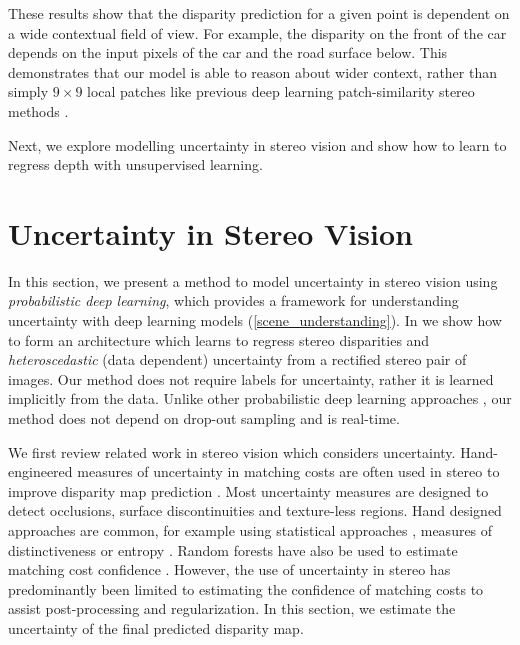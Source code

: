These results show that the disparity prediction for a given point is dependent on a wide contextual field of view. For example, the disparity on the front of the car depends on the input pixels of the car and the road surface below. This demonstrates that our model is able to reason about wider context, rather than simply $9\times9$ local patches like previous deep learning patch-similarity stereo methods \citep{zbontar2016stereo,luo2016efficient}.

Next, we explore modelling uncertainty in stereo vision and show how to learn to regress depth with unsupervised learning.




\section{Uncertainty in Stereo Vision}

In this section, we present a method to model uncertainty in stereo vision using \textit{probabilistic deep learning}, which provides a framework for understanding uncertainty with deep learning models (\cref{scene_understanding}). In  we show how to form an architecture which learns to regress stereo disparities and \textit{heteroscedastic} (data dependent) uncertainty \citep{der2009aleatory} from a rectified stereo pair of images. Our method does not require labels for uncertainty, rather it is learned implicitly from the data. Unlike other probabilistic deep learning approaches \citep{gal2016thesis}, our method does not depend on drop-out sampling and is real-time.

We first review related work in stereo vision which considers uncertainty. Hand-engineered measures of uncertainty in matching costs are often used in stereo to improve disparity map prediction \citep{hu2012quantitative,egnal2004stereo}. Most uncertainty measures are designed to detect occlusions, surface discontinuities and texture-less regions. Hand designed approaches are common, for example using statistical approaches \citep{sabater2012meaningful}, measures of distinctiveness \citep{yoon2007stereo,manduchi1999distinctiveness} or entropy \citep{scharstein1998stereo}. Random forests have also be used to estimate matching cost confidence  \citep{Haeusler2013a,Park2015}. However, the use of uncertainty in stereo has predominantly been limited to estimating the confidence of matching costs to assist post-processing and regularization. In this section, we estimate the uncertainty of the final predicted disparity map.

